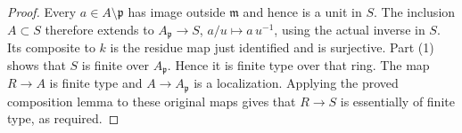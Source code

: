 \begin{proof}
Every $a\in A\setminus\mathfrak p$ has image outside
$\mathfrak m$ and hence is a unit in $S$. The inclusion
$A\subset S$ therefore extends to
$A_{\mathfrak p}\to S$, $a/u\mapsto a\,u^{-1}$,
using the actual inverse in $S$.
Its composite to $k$ is the residue map just identified and
is surjective. Part (1) shows that $S$ is finite over
$A_{\mathfrak p}$. Hence it is finite type over that ring.
The map $R\to A$ is finite type and $A\to A_{\mathfrak p}$
is a localization. Applying the proved composition lemma to
these original maps gives that $R\to S$ is essentially of
finite type, as required.
\end{proof}

